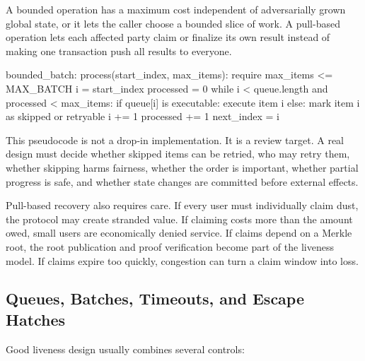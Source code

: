 A bounded operation has a maximum cost independent of adversarially grown global state, or it lets the caller choose a bounded slice of work. A pull-based operation lets each affected party claim or finalize its own result instead of making one transaction push all results to everyone.

\begin{codeblock}
bounded_batch:
    process(start_index, max_items):
        require max_items <= MAX_BATCH
        i = start_index
        processed = 0
        while i < queue.length and processed < max_items:
            if queue[i] is executable:
                execute item i
            else:
                mark item i as skipped or retryable
            i += 1
            processed += 1
        next_index = i
\end{codeblock}

This pseudocode is not a drop-in implementation. It is a review target. A real design must decide whether skipped items can be retried, who may retry them, whether skipping harms fairness, whether the order is important, whether partial progress is safe, and whether state changes are committed before external effects.

Pull-based recovery also requires care. If every user must individually claim dust, the protocol may create stranded value. If claiming costs more than the amount owed, small users are economically denied service. If claims depend on a Merkle root, the root publication and proof verification become part of the liveness model. If claims expire too quickly, congestion can turn a claim window into loss.

\subsection{Queues, Batches, Timeouts, and Escape Hatches}

Good liveness design usually combines several controls:

